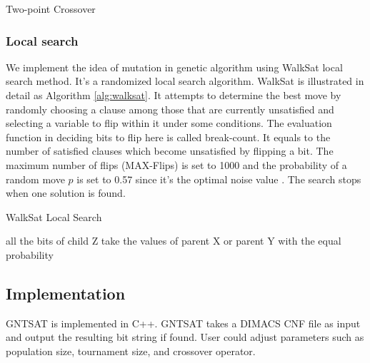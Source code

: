 	\begin{algorithm}
				\SetAlgoLined
				\caption{Two-point Crossover}
				\label{alg:twopoint} 
				\BlankLine
			  \end{algorithm}
	
	\subsubsection{Local search}
	We implement the idea of mutation in genetic algorithm using WalkSat local search method. It's a randomized local search algorithm. WalkSat is illustrated in detail as Algorithm \ref{alg:walksat}. It attempts to determine the best move by randomly choosing a clause among those that are currently unsatisfied and selecting a variable to flip within it under some conditions. The evaluation function in deciding bits to flip here is called break-count. It equals to the number of satisfied clauses which become unsatisfied by flipping a bit. The maximum number of flips (MAX-Flips) is set to 1000 and the probability of a random move $p$ is set to 0.57 since it's the optimal noise value \parencite{SAO05}. The search stops when one solution is found.
	
	\begin{algorithm*}
	  \SetAlgoLined
	  \caption{WalkSat Local Search}
	  \label{alg:walksat} 
	  \BlankLine
	    all the bits of child Z take the values of parent X or parent Y with the equal probability\;
	\end{algorithm*}
	\subsection{Implementation}
	GNTSAT is implemented in C++. GNTSAT takes a DIMACS CNF file as input and
	output the resulting bit string if found. User could adjust parameters such as
	population size, tournament size, and crossover operator.
	
